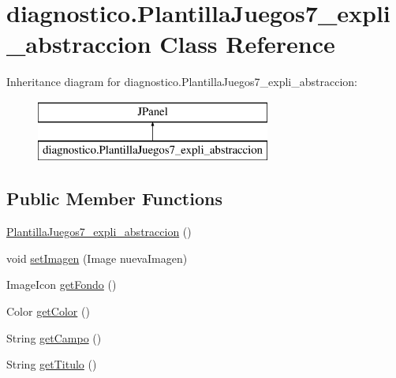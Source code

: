 \hypertarget{classdiagnostico_1_1_plantilla_juegos7__expli__abstraccion}{}\section{diagnostico.\+Plantilla\+Juegos7\+\_\+expli\+\_\+abstraccion Class Reference}
\label{classdiagnostico_1_1_plantilla_juegos7__expli__abstraccion}
Inheritance diagram for diagnostico.\+Plantilla\+Juegos7\+\_\+expli\+\_\+abstraccion\+:\begin{figure}[H]
\begin{center}
\leavevmode
\includegraphics[height=2.000000cm]{classdiagnostico_1_1_plantilla_juegos7__expli__abstraccion}
\end{center}
\end{figure}
\subsection*{Public Member Functions}
\begin{DoxyCompactItemize}
\item 
\mbox{\hyperlink{classdiagnostico_1_1_plantilla_juegos7__expli__abstraccion_ae5623fc9df0281aeda005589a48e1a2f}{Plantilla\+Juegos7\+\_\+expli\+\_\+abstraccion}} ()
\item 
void \mbox{\hyperlink{classdiagnostico_1_1_plantilla_juegos7__expli__abstraccion_a3fbb8660098f67c420c80e7465dbc312}{set\+Imagen}} (Image nueva\+Imagen)
\item 
Image\+Icon \mbox{\hyperlink{classdiagnostico_1_1_plantilla_juegos7__expli__abstraccion_a2b24f504dd9ba5a199d8cc2c70870922}{get\+Fondo}} ()
\item 
Color \mbox{\hyperlink{classdiagnostico_1_1_plantilla_juegos7__expli__abstraccion_a431ea0d193eb86774b03ca5104d9f4b7}{get\+Color}} ()
\item 
String \mbox{\hyperlink{classdiagnostico_1_1_plantilla_juegos7__expli__abstraccion_aa7f396dd601425b38124f8b42a6d6340}{get\+Campo}} ()
\item 
String \mbox{\hyperlink{classdiagnostico_1_1_plantilla_juegos7__expli__abstraccion_a2b4dde9c541f2f2e1bcd86e205618010}{get\+Titulo}} ()
\end{DoxyCompactItemize}

